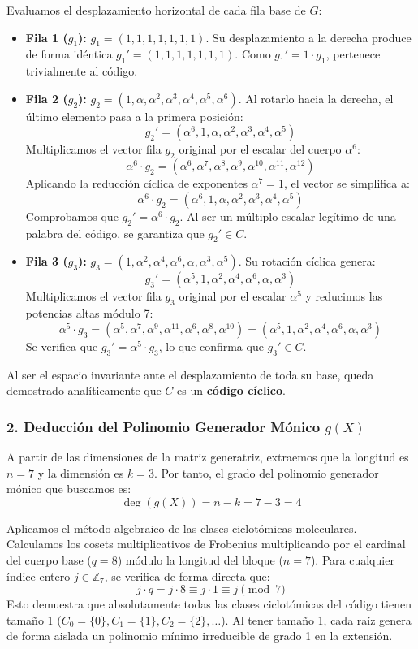 \documentclass{article}
\begin{document}
Evaluamos el desplazamiento horizontal de cada fila base de $G$:
\begin{itemize}
    \item \textbf{Fila 1 ($g_1$):} $g_1 = (1, 1, 1, 1, 1, 1, 1)$. Su desplazamiento a la derecha produce de forma idéntica $g_1' = (1, 1, 1, 1, 1, 1, 1)$. Como $g_1' = 1 \cdot g_1$, pertenece trivialmente al código.
    \item \textbf{Fila 2 ($g_2$):} $g_2 = (1, \alpha, \alpha^2, \alpha^3, \alpha^4, \alpha^5, \alpha^6)$. Al rotarlo hacia la derecha, el último elemento pasa a la primera posición:
    \[ g_2' = (\alpha^6, 1, \alpha, \alpha^2, \alpha^3, \alpha^4, \alpha^5) \]
    Multiplicamos el vector fila $g_2$ original por el escalar del cuerpo $\alpha^6$:
    \[ \alpha^6 \cdot g_2 = (\alpha^6, \alpha^7, \alpha^8, \alpha^9, \alpha^{10}, \alpha^{11}, \alpha^{12}) \]
    Aplicando la reducción cíclica de exponentes $\alpha^7 = 1$, el vector se simplifica a:
    \[ \alpha^6 \cdot g_2 = (\alpha^6, 1, \alpha, \alpha^2, \alpha^3, \alpha^4, \alpha^5) \]
    Comprobamos que $g_2' = \alpha^6 \cdot g_2$. Al ser un múltiplo escalar legítimo de una palabra del código, se garantiza que $g_2' \in C$.
    \item \textbf{Fila 3 ($g_3$):} $g_3 = (1, \alpha^2, \alpha^4, \alpha^6, \alpha, \alpha^3, \alpha^5)$. Su rotación cíclica genera:
    \[ g_3' = (\alpha^5, 1, \alpha^2, \alpha^4, \alpha^6, \alpha, \alpha^3) \]
    Multiplicamos el vector fila $g_3$ original por el escalar $\alpha^5$ y reducimos las potencias altas módulo 7:
    \[ \alpha^5 \cdot g_3 = (\alpha^5, \alpha^7, \alpha^9, \alpha^{11}, \alpha^6, \alpha^8, \alpha^{10}) = (\alpha^5, 1, \alpha^2, \alpha^4, \alpha^6, \alpha, \alpha^3) \]
    Se verifica que $g_3' = \alpha^5 \cdot g_3$, lo que confirma que $g_3' \in C$.
\end{itemize}
Al ser el espacio invariante ante el desplazamiento de toda su base, queda demostrado analíticamente que $C$ es un \textbf{código cíclico}.

\subsubsection{2. Deducción del Polinomio Generador Mónico \texorpdfstring{$g(X)$}{g(X)}}
A partir de las dimensiones de la matriz generatriz, extraemos que la longitud es $n = 7$ y la dimensión es $k = 3$. Por tanto, el grado del polinomio generador mónico que buscamos es:
\[ \operatorname{deg}(g(X)) = n - k = 7 - 3 = 4 \]

Aplicamos el método algebraico de las clases ciclotómicas moleculares. Calculamos los cosets multiplicativos de Frobenius multiplicando por el cardinal del cuerpo base ($q=8$) módulo la longitud del bloque ($n=7$). Para cualquier índice entero $j \in \mathbb{Z}_7$, se verifica de forma directa que:
\[ j \cdot q = j \cdot 8 \equiv j \cdot 1 \equiv j \pmod 7 \]
Esto demuestra que absolutamente todas las clases ciclotómicas del código tienen tamaño 1 ($C_0=\{0\}, C_1=\{1\}, C_2=\{2\}, \dots$). Al tener tamaño 1, cada raíz genera de forma aislada un polinomio mínimo irreducible de grado 1 en la extensión.
\end{document}
